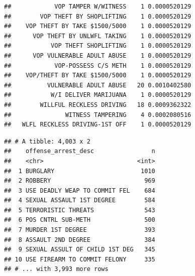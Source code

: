\documentclass[]{book}
\newenvironment{Shaded}{\begin{snugshade}}{\end{snugshade}}
\newcommand{\DataTypeTok}[1]{\textcolor[rgb]{0.13,0.29,0.53}{#1}}
\newcommand{\DecValTok}[1]{\textcolor[rgb]{0.00,0.00,0.81}{#1}}
\newcommand{\FloatTok}[1]{\textcolor[rgb]{0.00,0.00,0.81}{#1}}
\newcommand{\KeywordTok}[1]{\textcolor[rgb]{0.13,0.29,0.53}{\textbf{#1}}}
\newcommand{\NormalTok}[1]{#1}
\newcommand{\OperatorTok}[1]{\textcolor[rgb]{0.81,0.36,0.00}{\textbf{#1}}}
\newcommand{\OtherTok}[1]{\textcolor[rgb]{0.56,0.35,0.01}{#1}}
\newcommand{\StringTok}[1]{\textcolor[rgb]{0.31,0.60,0.02}{#1}}
\begin{document}
\begin{verbatim}
##            VOP TAMPER W/WITNESS    1 0.0000520129
##        VOP THEFT BY SHOPLIFTING    1 0.0000520129
##    VOP THEFT BY TAKE $1500/5000    1 0.0000520129
##      VOP THEFT BY UNLWFL TAKING    1 0.0000520129
##           VOP THEFT SHOPLIFTING    1 0.0000520129
##      VOP VULNERABLE ADULT ABUSE    1 0.0000520129
##            VOP-POSSESS C/S METH    1 0.0000520129
##    VOP/THEFT BY TAKE $1500/5000    1 0.0000520129
##          VULNERABLE ADULT ABUSE   20 0.0010402580
##           W/I DELIVER MARIJUANA    1 0.0000520129
##        WILLFUL RECKLESS DRIVING   18 0.0009362322
##               WITNESS TAMPERING    4 0.0002080516
##   WLFL RECKLESS DRIVING-1ST OFF    1 0.0000520129
\end{verbatim}

\begin{Shaded}
\end{Shaded}

\begin{verbatim}
## # A tibble: 4,003 x 2
##    offense_arrest_desc                n
##    <chr>                          <int>
##  1 BURGLARY                        1010
##  2 ROBBERY                          969
##  3 USE DEADLY WEAP TO COMMIT FEL    684
##  4 SEXUAL ASSAULT 1ST DEGREE        584
##  5 TERRORISTIC THREATS              543
##  6 POS CNTRL SUB-METH               500
##  7 MURDER 1ST DEGREE                393
##  8 ASSAULT 2ND DEGREE               384
##  9 SEXUAL ASSULT OF CHILD 1ST DEG   345
## 10 USE FIREARM TO COMMIT FELONY     335
## # ... with 3,993 more rows
\end{verbatim}

\begin{Shaded}
\end{Shaded}
\end{document}
